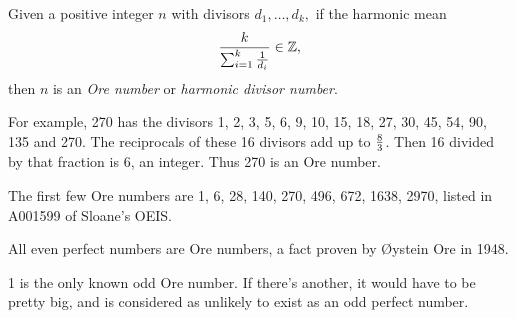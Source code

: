 \documentclass[12pt]{article}
\begin{document}
Given a positive integer $n$ with divisors $d_1, \ldots , d_k,$ if the harmonic mean $${k \over {\sum_{i = 1}^k {1 \over {d_i}}}} \in \Bbb{Z},$$ then $n$ is an {\em Ore number} or {\em harmonic divisor number}.

For example, 270 has the divisors 1, 2, 3, 5, 6, 9, 10, 15, 18, 27, 30, 45, 54, 90, 135 and 270. The reciprocals of these 16 divisors add up to ${8 \over 3}$. Then 16 divided by that fraction is 6, an integer. Thus 270 is an Ore number.

The first few Ore numbers are 1, 6, 28, 140, 270, 496, 672, 1638, 2970, listed in A001599 of Sloane's OEIS.

All even perfect numbers are Ore numbers, a fact proven by {\O}ystein Ore in 1948.

1 is the only known odd Ore number. If there's another, it would have to be pretty big, and is considered as unlikely to exist as an odd perfect number.
\end{document}
